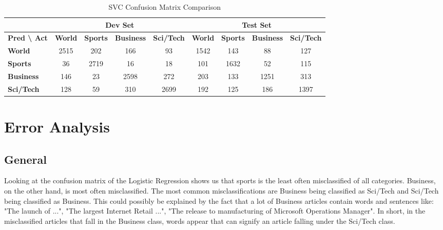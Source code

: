 \documentclass[12pt,a4paper,english]{article}
\begin{document}
\begin{table}[h]
    \centering
    \begin{tabular}{|l|cccc|cccc|}
        \hline
         & \multicolumn{4}{c|}{\textbf{Dev Set}} & \multicolumn{4}{c|}{\textbf{Test Set}} \\ \hline
        \textbf{Pred \textbackslash{} Act} & \textbf{World} & \textbf{Sports} & \textbf{Business} & \textbf{Sci/Tech} & \textbf{World} & \textbf{Sports} & \textbf{Business} & \textbf{Sci/Tech} \\ \hline
        \textbf{World} & 2515 & 202 & 166 & 93 & 1542 & 143 & 88 & 127 \\
        \textbf{Sports} & 36 & 2719 & 16 & 18 & 101 & 1632 & 52 & 115 \\
        \textbf{Business} & 146 & 23 & 2598 & 272 & 203 & 133 & 1251 & 313 \\
        \textbf{Sci/Tech} & 128 & 59 & 310 & 2699 & 192 & 125 & 186 & 1397 \\ \hline
    \end{tabular}
    \caption{SVC Confusion Matrix Comparison}
    \label{tab:svm_cm}
\end{table}

\section{Error Analysis}
\subsection{General}

Looking at the confusion matrix of the Logistic Regression shows us that sports is the least often misclassified of all categories. Business, on the other hand, is most often misclassified. The most common misclassifications are Business being classified as Sci/Tech and Sci/Tech being classified as Business. This could possibly be explained by the fact that a lot of Business articles contain words and sentences like: "The launch of ...", "The largest Internet Retail ...", "The release to manufacturing of Microsoft Operations Manager". In short, in the misclassified articles that fall in the Business class, words appear that can signify an article falling under the Sci/Tech class.
 
\end{document}
